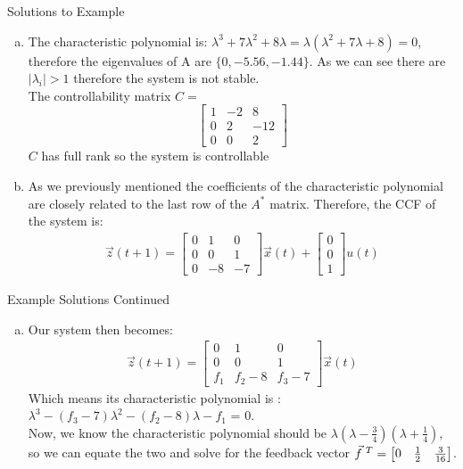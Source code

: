 \documentclass{beamer}
\begin{document}
	\begin{frame}{Solutions to Example}
	    \begin{enumerate}[(a)]
	        \item The characteristic polynomial is: $\lambda^3 + 7\lambda^2 + 8\lambda = \lambda(\lambda^2 +7\lambda +8) = 0$, therefore the eigenvalues of A are $\{0,-5.56, -1.44\}$. As we can see there are $|\lambda_i|>1$ therefore the system is not stable. \\
	        The controllability matrix $C =$ \[\begin{bmatrix}
	            1&-2&8\\
	            0&2&-12\\ 
	            0&0&2
	        \end{bmatrix}\]
	        $C$ has full rank so the system is controllable
	        
	        \item As we previously mentioned the coefficients of the characteristic polynomial are closely related to the last row of the $A^*$ matrix. Therefore, the CCF of the system is: 
	        \begin{align*}
	            \vec{z}(t+1) = 
	                \begin{bmatrix} 
	                    0&1&0\\
	                    0&0&1\\ 
	                    0&-8&-7
	            \end{bmatrix}\vec{x}(t) + \begin{bmatrix} 0 \\ 0 \\1 \end{bmatrix}u(t) 
	        \end{align*}
	    \end{enumerate}
	\end{frame}

	\begin{frame}{Example Solutions Continued}
	\begin{enumerate}[(c)]
	   \item Our system then becomes: 
	   \begin{align*}
	            \vec{z}(t+1) = 
	                \begin{bmatrix} 
	                    0&1&0\\
	                    0&0&1\\ 
	                    f_1&f_2-8&f_3-7
	            \end{bmatrix}\vec{x}(t) 
	        \end{align*}
	    Which means its characteristic polynomial is : $\lambda^3 - (f_3 -7)\lambda^2 -(f_2 - 8)\lambda - f_1$ = 0. \\
	   Now, we know the characteristic polynomial should be $\lambda(\lambda - \frac{3}{4})(\lambda + \frac{1}{4})$, so we can equate the two and solve for the feedback vector $\vec{f}\hspace{0.1cm}^T = \begin{bmatrix}  0 & \frac{1}{2}& \frac{3}{16}\end{bmatrix}$.
	\end{enumerate}
	\end{frame}
\end{document}
